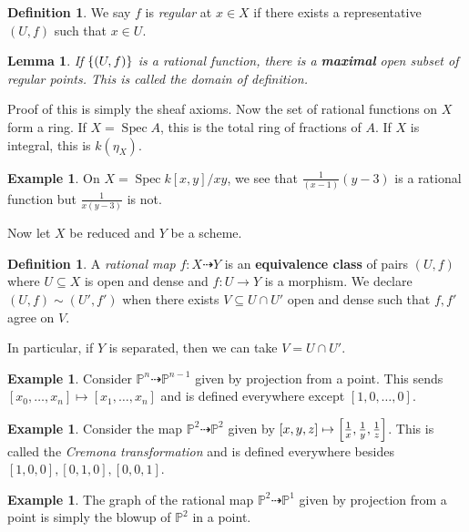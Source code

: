 \documentclass[leqno, openany]{memoir}
\newtheorem{lem}[thm]{Lemma}
\theoremstyle{definition}
\newtheorem{defn}[thm]{Definition}
\newtheorem{exm}[thm]{Example}
\theoremstyle{remark}
\theoremstyle{plain}
\theoremstyle{definition}
\theoremstyle{remark}
\renewcommand{\P}{\mathbb{P}}
\DeclareMathOperator{\Spec}{Spec}
\begin{document}
\begin{defn}
    We say $f$ is \textit{regular} at $x \in X$ if there exists a representative $(U, f)$ such that $x \in U$.
\end{defn}

\begin{lem}
    If $\qty{(U, f)}$ is a rational function, there is a \textbf{maximal} open subset of regular points. This is called the \textit{domain of definition}. 
\end{lem}

Proof of this is simply the sheaf axioms. Now the set of rational functions on $X$ form a ring. If $X = \Spec A$, this is the total ring of fractions of $A$. If $X$ is integral, this is $k(\eta_X)$.

\begin{exm}
    On $X = \Spec k[x,y]/xy$, we see that $\frac{1}{(x-1)}{(y-3)}$ is a rational function but $\frac{1}{x(y-3)}$ is not.
\end{exm}

Now let $X$ be reduced and $Y$ be a scheme.
\begin{defn}
    A \textit{rational map} $f \colon X \dashrightarrow Y$ is an \textbf{equivalence class} of pairs ${(U, f)}$ where $U \subseteq X$ is open and dense and $f \colon U \to Y$ is a morphism. We declare $(U, f) \sim (U', f')$ when there exists $V \subseteq U \cap U'$ open and dense such that $f,f'$ agree on $V$.
\end{defn}

In particular, if $Y$ is separated, then we can take $V = U \cap U'$.

\begin{exm}
    Consider $\P^n \dashrightarrow \P^{n-1}$ given by projection from a point. This sends $[x_0, \ldots, x_n] \mapsto [x_1, \ldots, x_n]$ and is defined everywhere except $[1,0,\ldots,0]$.
\end{exm}

\begin{exm}
    Consider the map $\P^2 \dashrightarrow \P^2$ given by $[x,y,z] \mapsto \qty[\frac{1}{x}, \frac{1}{y}, \frac{1}{z}]$. This is called the \textit{Cremona transformation} and is defined everywhere besides $[1,0,0], [0,1,0], [0,0,1]$. 
\end{exm}

\begin{exm}
    The graph of the rational map $\P^2 \dashrightarrow \P^1$ given by projection from a point is simply the blowup of $\P^2$ in a point.
\end{exm}
\end{document}
